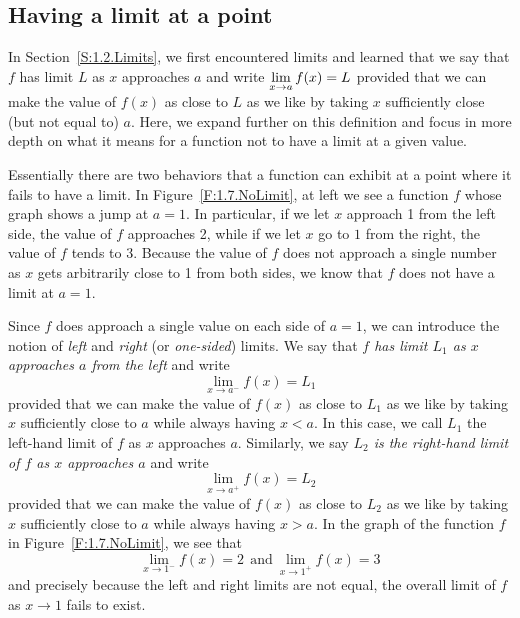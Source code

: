 

\subsection*{Having a limit at a point}

In Section~\ref{S:1.2.Limits}, we first encountered limits and learned that we say that $f$ has limit $L$ as $x$ approaches $a$ and write $\displaystyle \lim_{x \to a} f(x) = L$ provided that we can make the value of $f(x)$ as close to $L$ as we like by taking $x$ sufficiently close (but not equal to) $a$.  Here, we expand further on this definition and focus in more depth on what it means for a function not to have a limit at a given value.  

Essentially there are two behaviors that a function can exhibit at a point where it fails to have a limit.  In Figure~\ref{F:1.7.NoLimit}, at left we see a function $f$ whose graph shows a jump at $a = 1$.  In particular, if we let $x$ approach 1 from the left side, the value of $f$ approaches 2, while if we let $x$ go to $1$ from the right, the value of $f$ tends to 3.  Because the value of $f$ does not approach a single number as $x$ gets arbitrarily close to 1 from both sides, we know that $f$ does not have a limit at $a = 1$.  

Since $f$ does approach a single value on each side of $a = 1$, we can introduce the notion of \emph{left} and \emph{right}  (or \emph{one-sided}) limits.     We say that \emph{$f$ has limit $L_1$ as $x$ approaches $a $ from the left} and write
$$\lim_{x \to a^-} f(x) = L_1$$
 provided that we can make the value of $f(x)$ as close to $L_1$ as we like by taking $x$ sufficiently close to $a$ while always having $x < a$.  In this case, we call $L_1$ the left-hand limit of $f$ as $x$ approaches $a$.  Similarly, we say \emph{$L_2$ is the right-hand limit of $f$ as $x$ approaches $a$} and write
$$\lim_{x \to a^+} f(x) = L_2$$
provided that we can make the value of $f(x)$ as close to $L_2$ as we like by taking $x$ sufficiently close to $a$ while always having $x > a$.  In the graph of the function $f$ in Figure~\ref{F:1.7.NoLimit}, we see that 
$$\lim_{x \to 1^-} f(x) = 2 \ \ \mbox{and} \ \lim_{x \to 1^+} f(x) = 3$$
and precisely because the left and right limits are not equal, the overall limit of $f$ as $x \to 1$ fails to exist.

